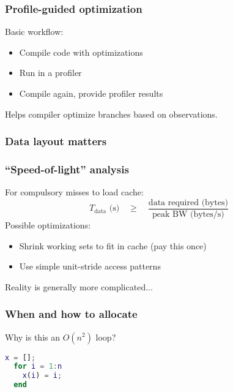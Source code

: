\documentclass{beamer}
\begin{document}
\begin{frame}
  \frametitle{Profile-guided optimization}

  Basic workflow:
  \begin{itemize}
  \item Compile code with optimizations
  \item Run in a profiler
  \item Compile again, provide profiler results
  \end{itemize}
  Helps compiler optimize branches based on observations.
\end{frame}




\begin{frame}
  \frametitle{Data layout matters}
\end{frame}


\begin{frame}
  \frametitle{``Speed-of-light'' analysis}

  For compulsory misses to load cache:
  \[
  T_{\mbox{data}} \mbox{ (s)}
  \quad \geq \quad
  \frac{\mbox{data required (bytes)}}
       {\mbox{peak BW (bytes/s)}}
  \]
  Possible optimizations:
  \begin{itemize}
  \item Shrink working sets to fit in cache (pay this once)
  \item Use simple unit-stride access patterns
  \end{itemize}
  Reality is generally more complicated...  
\end{frame}


\begin{frame}[fragile]
  \frametitle{When and how to allocate}

Why is this an $O(n^2)$ loop?
\begin{lstlisting}[language=Matlab]
  x = [];
  for i = 1:n
    x(i) = i;
  end
\end{lstlisting}  
\end{frame}
\end{document}
